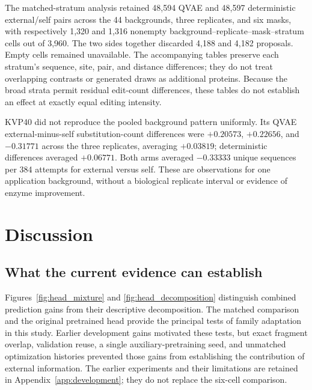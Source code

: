 \documentclass[referee,pdflatex,sn-vancouver-num]{sn-jnl}
\begin{document}
The matched-stratum analysis retained 48,594 QVAE and 48,597 deterministic external/self pairs across the 44 backgrounds, three replicates, and six masks, with respectively 1,320 and 1,316 nonempty background--replicate--mask--stratum cells out of 3,960. The two sides together discarded 4,188 and 4,182 proposals. Empty cells remained unavailable. The accompanying tables preserve each stratum's sequence, site, pair, and distance differences; they do not treat overlapping contrasts or generated draws as additional proteins. Because the broad strata permit residual edit-count differences, these tables do not establish an effect at exactly equal editing intensity.

KVP40 did not reproduce the pooled background pattern uniformly. Its QVAE external-minus-self substitution-count differences were $+0.20573$, $+0.22656$, and $-0.31771$ across the three replicates, averaging $+0.03819$; deterministic differences averaged $+0.06771$. Both arms averaged $-0.33333$ unique sequences per 384 attempts for external versus self. These are observations for one application background, without a biological replicate interval or evidence of enzyme improvement.



\section{Discussion}
\subsection{What the current evidence can establish}
Figures~\ref{fig:head_mixture} and \ref{fig:head_decomposition} distinguish combined prediction gains from their descriptive decomposition. The matched comparison and the original pretrained head provide the principal tests of family adaptation in this study. Earlier development gains motivated these tests, but exact fragment overlap, validation reuse, a single auxiliary-pretraining seed, and unmatched optimization histories prevented those gains from establishing the contribution of external information. The earlier experiments and their limitations are retained in Appendix~\ref{app:development}; they do not replace the six-cell comparison.
\end{document}
